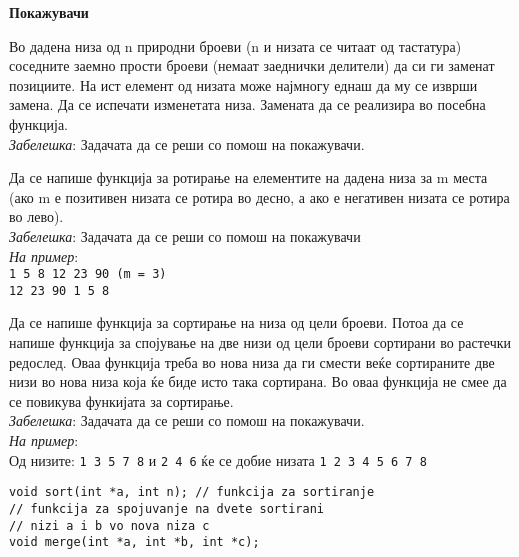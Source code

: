 \documentclass[12pt,a4paper]{exam}
\begin{document}
\pagestyle{headandfoot}
\headrule
{}
\begin{center}
\Large{\textbf{Покажувачи}}
\end{center}
\begin{questions}

\question
Во дадена низа од n природни броеви (n и низата се читаат од тастатура) соседните заемно
прости броеви (немаат заеднички делители) да си ги заменат позициите. На ист елемент од
низата може најмногу еднаш да му се изврши замена. Да се испечати изменетата низа.
Замената да се реализира во посебна функција.\\
\emph{Забелешка}: Задачата да се реши со помош на покажувачи.

\question
Да се напише функција за ротирање на елементите на дадена низа за m места (ако m е
позитивен низата се ротира во десно, а ако е негативен низата се ротира во
лево).\\ \emph{Забелешка}: Задачата да се реши со помош на покажувачи
\\\emph{На пример}:\\
\texttt{1 5 8 12 23 90 (m = 3)}\\
\texttt{12 23 90 1 5 8}

\question
Да се напише функција за сортирање на низа од цели броеви. Потоа да се напише
функција за спојување на две низи од цели броеви сортирани во растечки редослед.
Оваа функција треба во нова низа да ги смести веќе сортираните две низи во
нова низа која ќе биде исто така сортирана. Во оваа функција не смее да се
повикува функијата за сортирање.
\\\emph{Забелешка}: Задачата да се реши со помош на покажувачи. 
\\\emph{На пример}:\\ Од низите: \texttt{1 3 5 7 8} и \texttt{2 4 6} ќе се добие
низата \texttt{1 2 3 4 5 6 7 8}
\begin{lstlisting}
void sort(int *a, int n); // funkcija za sortiranje
// funkcija za spojuvanje na dvete sortirani
// nizi a i b vo nova niza c
void merge(int *a, int *b, int *c); 
\end{lstlisting}
\end{questions}
\end{document}
